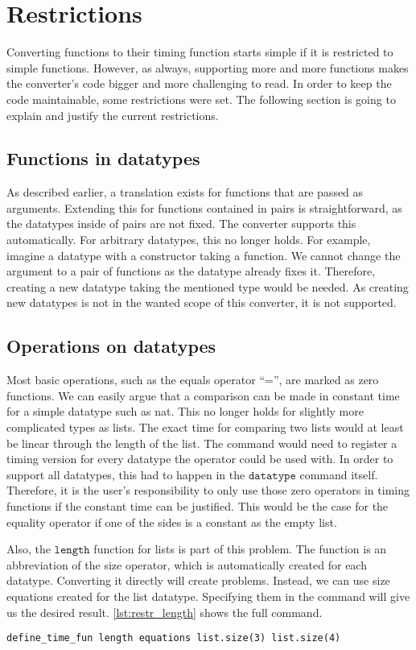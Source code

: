 
\section{Restrictions} \label{chapter:restrictions}

Converting functions to their timing function starts simple if it is restricted to simple functions.
However, as always, supporting more and more functions makes the converter's code bigger and more challenging to read.
In order to keep the code maintainable, some restrictions were set.
The following section is going to explain and justify the current restrictions.

\subsection{Functions in datatypes}
As described earlier, a translation exists for functions that are passed as arguments.
Extending this for functions contained in pairs is straightforward, as the datatypes inside of pairs are not fixed.
The converter supports this automatically.
For arbitrary datatypes, this no longer holds.
For example, imagine a datatype with a constructor taking a function.
We cannot change the argument to a pair of functions as the datatype already fixes it.
Therefore, creating a new datatype taking the mentioned type would be needed.
As creating new datatypes is not in the wanted scope of this converter, it is not supported.

\subsection{Operations on datatypes} \label{chapter:nonconstant_zeros}
Most basic operations, such as the equals operator ``='', are marked as zero functions.
We can easily argue that a comparison can be made in constant time for a simple datatype such as nat.
This no longer holds for slightly more complicated types as lists.
The exact time for comparing two lists would at least be linear through the length of the list.
The command would need to register a timing version for every datatype the operator could be used with.
In order to support all datatypes, this had to happen in the $\texttt{datatype}$ command itself.
Therefore, it is the user's responsibility to only use those zero operators in timing functions if the constant time can be justified.
This would be the case for the equality operator if one of the sides is a constant as the empty list.

Also, the $\texttt{length}$ function for lists is part of this problem.
The function is an abbreviation of the size operator, which is automatically created for each datatype.
Converting it directly will create problems.
Instead, we can use size equations created for the list datatype.
Specifying them in the command will give us the desired result.
\autoref{lst:restr_length} shows the full command.
\begin{lstlisting}[language=isabelle,float,label=lst:restr_length,caption=Converting the length function correctly]
  define_time_fun length equations list.size(3) list.size(4)
\end{lstlisting}

